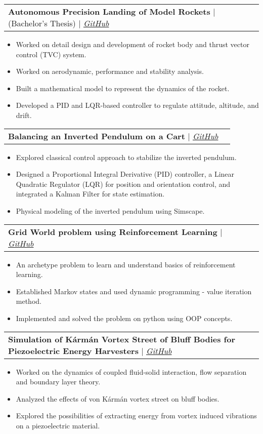\documentclass[letterpaper,11pt]{article}
\makeatletter
\newcommand{\resumeItem}[1]{
  \item\small{
    {#1 \vspace{-2pt}}
  }
}
\newcommand{\resumeProjectHeading}[2]{
    \vspace{-2pt}\item
    \begin{tabular*}{0.97\textwidth}{l@{\extracolsep{\fill}}r}
      \small#1 & #2 \\
    \end{tabular*}\vspace{-7pt}
}
\newcommand{\resumeItemListStart}{\begin{itemize}}
\newcommand{\resumeItemListEnd}{\end{itemize}\vspace{-5pt}}
\makeatother
\begin{document}
      \resumeProjectHeading
        {\textbf{Autonomous Precision Landing of Model Rockets} $|$ (Bachelor's Thesis) $|$ \emph{\href{https://github.com/raghavvs/Autonomous-Landing-of-Model-Rockets}{\color{blue}GitHub}}}{} 
          \resumeItemListStart
            \resumeItem{Worked on detail design and development of rocket body and thrust vector control (TVC) system.}
            \resumeItem{Worked on aerodynamic, performance and stability analysis.}
            \resumeItem{Built a mathematical model to represent the dynamics of the rocket.}
            \resumeItem{Developed a PID and LQR-based controller to regulate attitude, altitude, and drift.}
          \resumeItemListEnd
      
      \resumeProjectHeading
        {\textbf{Balancing an Inverted Pendulum on a Cart} $|$ \emph{\href{https://github.com/raghavvs/Inverted-Pendulum-on-a-Cart}{\color{blue}GitHub}}}{}
          \resumeItemListStart
            \resumeItem{Explored classical control approach to stabilize the inverted pendulum.}
            \resumeItem{Designed a Proportional Integral Derivative (PID) controller, a Linear Quadratic Regulator (LQR) for
						position and orientation control, and integrated a Kalman Filter for state estimation.}
			\resumeItem{Physical modeling of the inverted pendulum using Simscape.}
          \resumeItemListEnd
      
      \resumeProjectHeading
        {\textbf{Grid World problem using Reinforcement Learning} $|$ \emph{\href{https://github.com/raghavvs/Grid-world-reinforcement-learning}{\color{blue}GitHub}}}{}
          \resumeItemListStart
            \resumeItem{An archetype problem to learn and understand basics of reinforcement learning.}
            \resumeItem{Established Markov states and used dynamic programming - value iteration method.}
            \resumeItem{Implemented and solved the problem on python using OOP concepts.}
          \resumeItemListEnd
      
      \resumeProjectHeading
        {\textbf{Simulation of Kármán Vortex Street of Bluff Bodies for Piezoelectric Energy Harvesters} $|$ \emph{\href{https://github.com/raghavvs/Simulation-of-Karman-Vortex-Street-of-Bluff-Bodies-for-Piezoelectric-Energy-Harvesters}{\color{blue}GitHub}}}{}
          \resumeItemListStart
            \resumeItem{Worked on the dynamics of coupled fluid-solid interaction, flow separation and boundary layer theory.}
            \resumeItem{Analyzed the effects of von Kármán vortex street on bluff bodies.}
            \resumeItem{Explored the possibilities of extracting energy from vortex induced vibrations on a piezoelectric material.}
          \resumeItemListEnd
      
\end{document}
